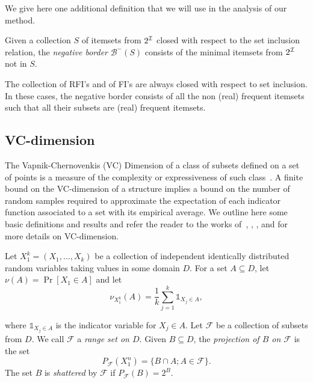 \iffalse
We believe that the collection of RFI's is more interesting than the set of
FI's, as the final goal of market basket analysis is to gain a better
understanding of the \emph{process generating the data}, i.e., of the real
frequency function $r_p$, which is only partially and noisily captured by the
dataset $\Ds$.
\fi

We give here one additional definition that we will use in the analysis of our
method.

\begin{definition}\label{def:negborder}
  Given a collection $S$ of itemsets from $2^{{\cal I}}$ closed with respect to the
  set inclusion relation, the \emph{negative border} $\mathcal{B}^-(S)$ consists
  of the
  minimal itemsets from $2^{{\cal I}}$ not in $S$.
\end{definition}
The collection of RFI's and of FI's are always closed with respect to set
inclusion. In these cases, the negative border consists of all the non (real)
frequent itemsets such that all their subsets are (real) frequent itemsets.
\\

\subsection{VC-dimension}\label{sec:prelvcdim}
The Vapnik-Chernovenkis (VC) Dimension of a class of subsets defined
on a set of points is a measure of the complexity or expressiveness of such
class~\citep{VapnikC71}. A finite bound on the VC-dimension of a
structure implies a bound on the number of random samples required to
approximate the expectation of each indicator function associated to a set with
its empirical average. We outline here some basic definitions and results and
refer the reader to the works of~\citet[Sect.~12.4]{DevroyeGL96},
\citet[Sect.~3]{BoucheronBL05}, \citet[Sect.~14.4]{AlonS08}, and
\citet{Vapnik99} for more details on VC-dimension.

Let $X_1^k=(X_1,\dotsc,X_k)$ be a collection of independent identically
distributed random variables taking values in some domain $D$.
For a set $A\subseteq D$, let $\nu(A)=\Pr[X_1\in A]$ and let
\[
\nu_{X_1^k}(A)=\frac{1}{k}\sum_{j=1}^k\mathds{1}_{X_j\in A},\]

where $\mathds{1}_{X_j\in A}$ is the indicator variable for $X_j\in A$.
Let $\mathcal{F}$ be a collection of subsets from $D$. We call $\mathcal{F}$ a
\emph{range set on $D$}.
Given $B\subseteq D$, the \emph{projection of $B$ on $\mathcal{F}$} is the set 
\[
P_\mathcal{F}(X_1^n)=\{ B\cap A; A\in\mathcal{F}\}.\]
The set $B$ is \emph{shattered} by $\mathcal{F}$ if $P_\mathcal{F}(B)=2^B$.

